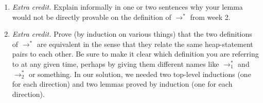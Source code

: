 \documentclass{article}
\theoremstyle{definition}
\begin{document}
\begin{enumerate}[start=1,label={{\bf Problem \arabic*}.},ref=\arabic*,left=0pt..0pt,widest*=10,align=left,itemindent=*]
\begin{enumerate}[resume*]
  \item \textit{Extra credit.} Explain informally in one or two sentences why your lemma
    would not be directly provable on the definition of $\to^*$ from week 2.
  \item \textit{Extra credit.} Prove (by induction on various things) that the
    two definitions of $\to^*$ are equivalent in the sense that they relate the
    same heap-statement pairs to each other. Be sure to make it clear which
    definition you are referring to at any given time, perhaps by giving them
    different names like $\to_1^*$ and $\to^*_2$ or something. In our solution,
    we needed two top-level inductions (one for each direction) and two lemmas
    proved by induction (one for each direction).
  \end{enumerate}
\end{enumerate}
\end{document}
